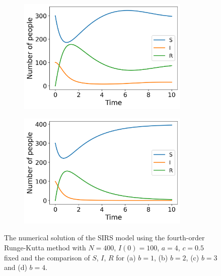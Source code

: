 \documentclass[../main.tex]{subfiles}
\begin{document}
\begin{figure}[htb!]
    \begin{subfigure}[b]{0.475\textwidth}
    \centering
    \includegraphics[width=0.9\textwidth]{../figures/SIRS_rk4_b=3.png}
    \caption{}
    \label{fig:b=3}
    \end{subfigure}
    \quad
    \begin{subfigure}[b]{0.475\textwidth}
    \includegraphics[width=0.9\textwidth]{../figures/SIRS_rk4_b=4.png}
    \caption{}
    \label{fig:b=4}
    \end{subfigure}
    \caption{The numerical solution of the SIRS model using the fourth-order Runge-Kutta method with $N=400$, $I(0)=100$, $a=4$, $c=0.5$ fixed and the comparison of $S$, $I$, $R$ for (a)  $b=1$, (b) $b=2$, (c) $b=3$ and (d) $b=4$.}
    \label{fig:SIRS_rk4}
\end{figure}
\fi
\end{document}
